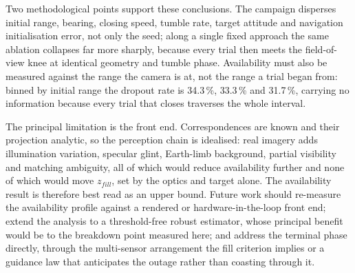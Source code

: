 Two methodological points support these conclusions. The campaign disperses
initial range, bearing, closing speed, tumble rate, target attitude and
navigation initialisation error, not only the seed; along a single fixed
approach the same ablation collapses far more sharply, because every trial then
meets the field-of-view knee at identical geometry and tumble phase.
Availability must also be measured against the range the camera is at, not the
range a trial began from: binned by initial range the dropout rate is
34.3\,\%, 33.3\,\% and 31.7\,\%, carrying no information because every trial
that closes traverses the whole interval.

The principal limitation is the front end. Correspondences are known and their
projection analytic, so the perception chain is idealised: real imagery adds
illumination variation, specular glint, Earth-limb background, partial
visibility and matching ambiguity, all of which would reduce availability
further and none of which would move $z_{fill}$, set by the optics and target
alone. The availability result is therefore best read as an upper bound.
Future work should re-measure the availability profile against a rendered or
hardware-in-the-loop front end; extend the analysis to a threshold-free robust
estimator, whose principal benefit would be to the breakdown point measured
here; and address the terminal phase directly, through the multi-sensor
arrangement the fill criterion implies or a guidance law that anticipates the
outage rather than coasting through it.
